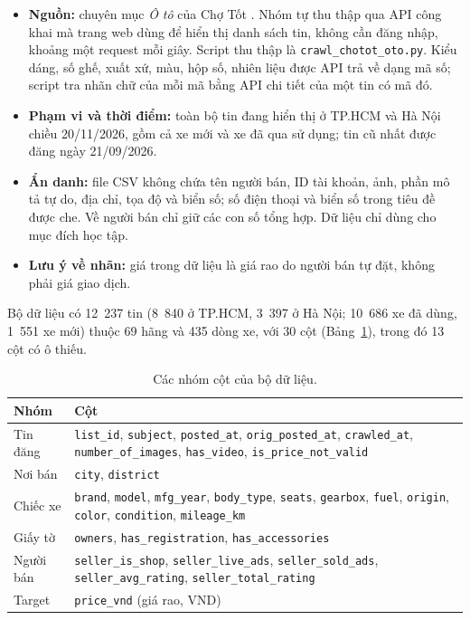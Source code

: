 \begin{itemize}
  \item \textbf{Nguồn:} chuyên mục \textit{Ô tô} của Chợ Tốt \cite{tab-chotot}. Nhóm tự thu thập qua API công khai mà
        trang web dùng để hiển thị danh sách tin, không cần đăng nhập, khoảng một request mỗi giây. Script thu thập là
        \texttt{crawl\_chotot\_oto.py}. Kiểu dáng, số ghế, xuất xứ, màu, hộp số, nhiên liệu được API trả về dạng mã
        số; script tra nhãn chữ của mỗi mã bằng API chi tiết của một tin có mã đó.
  \item \textbf{Phạm vi và thời điểm:} toàn bộ tin đang hiển thị ở TP.HCM và Hà Nội chiều 20/11/2026, gồm cả xe mới và
        xe đã qua sử dụng; tin cũ nhất được đăng ngày 21/09/2026.
  \item \textbf{Ẩn danh:} file CSV không chứa tên người bán, ID tài khoản, ảnh, phần mô tả tự do, địa chỉ, tọa độ và biển
        số; số điện thoại và biển số trong tiêu đề được che. Về người bán chỉ giữ các con số tổng hợp. Dữ liệu chỉ dùng
        cho mục đích học tập.
  \item \textbf{Lưu ý về nhãn:} giá trong dữ liệu là giá rao do người bán tự đặt, không phải giá giao dịch.
\end{itemize}

Bộ dữ liệu có 12~237 tin (8~840 ở TP.HCM, 3~397 ở Hà Nội; 10~686 xe đã dùng, 1~551 xe mới) thuộc 69 hãng và 435 dòng
xe, với 30 cột (Bảng~\ref{tab:tab-cols}), trong đó 13 cột có ô thiếu.

\begin{table}[H]\centering
\caption{Các nhóm cột của bộ dữ liệu.}\label{tab:tab-cols}
\begin{tabular}{>{\raggedright\arraybackslash}p{2.4cm}>{\raggedright\arraybackslash}p{12cm}}
\toprule
Nhóm & Cột \\
\midrule
Tin đăng & \texttt{list\_id}, \texttt{subject}, \texttt{posted\_at}, \texttt{orig\_posted\_at}, \texttt{crawled\_at}, \texttt{number\_of\_images}, \texttt{has\_video}, \texttt{is\_price\_not\_valid} \\
Nơi bán & \texttt{city}, \texttt{district} \\
Chiếc xe & \texttt{brand}, \texttt{model}, \texttt{mfg\_year}, \texttt{body\_type}, \texttt{seats}, \texttt{gearbox}, \texttt{fuel}, \texttt{origin}, \texttt{color}, \texttt{condition}, \texttt{mileage\_km} \\
Giấy tờ & \texttt{owners}, \texttt{has\_registration}, \texttt{has\_accessories} \\
Người bán & \texttt{seller\_is\_shop}, \texttt{seller\_live\_ads}, \texttt{seller\_sold\_ads}, \texttt{seller\_avg\_rating}, \texttt{seller\_total\_rating} \\
Target & \texttt{price\_vnd} (giá rao, VND) \\
\bottomrule
\end{tabular}
\end{table}

